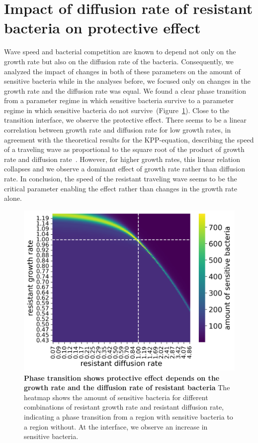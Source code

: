 \section{Impact of diffusion rate of resistant bacteria on protective effect}
Wave speed and bacterial competition are known to depend not only on the growth rate but also on the diffusion rate of the bacteria. Consequently, we analyzed the impact of changes in both of these parameters on the amount of sensitive bacteria while in the analyses before, we focused only on changes in the growth rate and the diffusion rate was equal. We found a clear phase transition from a parameter regime in which sensitive bacteria survive to a parameter regime in which sensitive bacteria do not survive~(Figure~\ref{fig:results_heatmap_effect}). Close to the transition interface, we observe the protective effect. There seems to be a linear correlation between growth rate and diffusion rate for low growth rates, in agreement with the theoretical results for the KPP-equation, describing the speed of a traveling wave as proportional to the square root of the product of growth rate and diffusion rate~\cite{Murray2002-qj, Fisher1937-rd}. However, for higher growth rates, this linear relation collapses and we observe a dominant effect of growth rate rather than diffusion rate. In conclusion, the speed of the resistant traveling wave seems to be the critical parameter enabling the effect rather than changes in the growth rate alone.
\begin{figure}
\centering
\includegraphics[width=\linewidth]{graphics/2025_09_30_phages_fig9.png}
\caption{\textbf{Phase transition shows protective effect depends on the growth rate and the diffusion rate of resistant bacteria} The heatmap shows the amount of sensitive bacteria for different combinations of resistant growth rate and resistant diffusion rate, indicating a phase transition from a region with sensitive bacteria to a region without. At the interface, we observe an increase in sensitive bacteria.}
\label{fig:results_heatmap_effect}
\end{figure}

